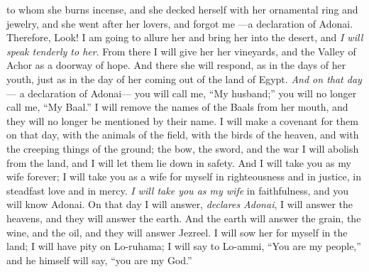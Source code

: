 \begin{biblechapter}
to whom she burns incense, 
and she decked herself with her ornamental ring and jewelry, 
and she went after her lovers, and forgot me 
—a declaration of Adonai.
\verse Therefore, Look! I am going to allure her 
and bring her into the desert, 
and \textit{I will speak tenderly to her}.
\verse From there I will give her 
her vineyards, 
and the Valley of Achor as a doorway of hope. 
And there she will respond, 
as in the days of her youth, 
just as in the day of her coming out of 
the land of Egypt.
\verse \textit{And on that day}— 
a declaration of Adonai— 
you will call me, “My husband;” 
you will no longer call me, “My Baal.”
\verse I will remove the names 
of the Baals from her mouth, 
and they will no longer be mentioned by their name.
\verse I will make a covenant for them on that day, 
with the animals of the field, 
with the birds of the heaven, and 
with the creeping things of the ground; 
the bow, the sword, and the war I will abolish from the land, and I will let them lie down in safety.
\verse And I will take you as my wife forever; 
I will take you as a wife for myself in righteousness and in justice, 
in steadfast love and in mercy.
\verse \textit{I will take you as my wife} in faithfulness, 
and you will know Adonai.
\verse On that day I will answer, \textit{declares Adonai}, 
I will answer the heavens, 
and they will answer the earth.
\verse And the earth will answer 
the grain, the wine, and the oil, 
and they will answer Jezreel.
\verse I will sow her for myself in the land; 
I will have pity on Lo-ruhama; 
I will say to Lo-ammi, 
“You are my people,” 
and he himself will say, “you are my God.”
\end{biblechapter}

